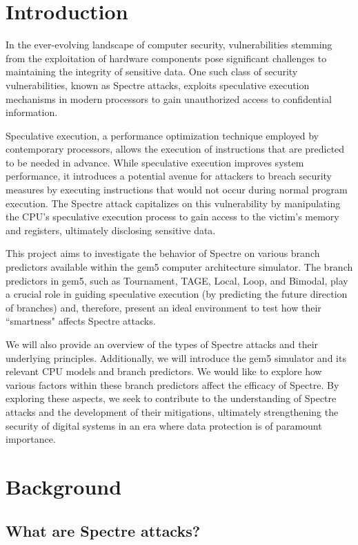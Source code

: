 \documentclass[twocolumn,showpacs,%
  nofootinbib,aps,superscriptaddress,%
  eqsecnum,prd,notitlepage,showkeys,10pt]{revtex4-1}
\begin{document}
\section{Introduction}

In the ever-evolving landscape of computer security, vulnerabilities stemming from the exploitation of hardware components pose significant challenges to maintaining the integrity of sensitive data. One such class of security vulnerabilities, known as Spectre attacks, exploits speculative execution mechanisms in modern processors to gain unauthorized access to confidential information.

Speculative execution, a performance optimization technique employed by contemporary processors, allows the execution of instructions that are predicted to be needed in advance. While speculative execution improves system performance, it introduces a potential avenue for attackers to breach security measures by executing instructions that would not occur during normal program execution. The Spectre attack capitalizes on this vulnerability by manipulating the CPU's speculative execution process to gain access to the victim's memory and registers, ultimately disclosing sensitive data.

This project aims to investigate the behavior of Spectre on various branch predictors available within the gem5 computer architecture simulator. The branch predictors in gem5, such as Tournament, TAGE, Local, Loop, and Bimodal, play a crucial role in guiding speculative execution (by predicting the future direction of branches) and, therefore, present an ideal environment to test how their ``smartness" affects Spectre attacks.

We will also provide an overview of the types of Spectre attacks and their underlying principles. Additionally, we will introduce the gem5 simulator and its relevant CPU models and branch predictors. We would like to explore how various factors within these branch predictors affect the efficacy of Spectre. By exploring these aspects, we seek to contribute to the understanding of Spectre attacks and the development of their mitigations, ultimately strengthening the security of digital systems in an era where data protection is of paramount importance.


\section{Background}

\subsection{What are Spectre attacks?}
\end{document}
